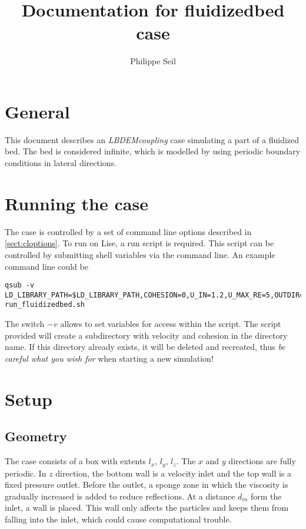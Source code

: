 \documentclass[12pt]{article}
\title{Documentation for fluidizedbed case}
\author{Philippe Seil}
\begin{document}
\maketitle
\tableofcontents

\section{General}

This document describes an \emph{LBDEMcoupling} case simulating a part
of a fluidized bed. The bed is considered infinite, which is modelled
by using periodic boundary conditions in lateral directions. \\

\section{Running the case}

The case is controlled by a set of command line options described in
\cref{sect:cloptions}. To run on Lise, a run script is required. This
script can be controlled by submitting shell variables via the command
line. An example command line could be
\begin{lstlisting}
qsub -v LD_LIBRARY_PATH=$LD_LIBRARY_PATH,COHESION=0,U_IN=1.2,U_MAX_RE=5,OUTDIR=air_test/ run_fluidizedbed.sh
\end{lstlisting}
The switch $-v$ allows to set variables for access within the
script. The script provided will create a subdirectory with velocity
and cohesion in the directory name. If this directory already exists,
it will be deleted and recreated, thus \emph{be careful what you wish
  for} when starting a new simulation! \\

\section{Setup}
\subsection{Geometry}

The case consists of a box with extents $l_x$, $l_y$, $l_z$. The $x$
and $y$ directions are fully periodic. In $z$ direction, the bottom
wall is a velocity inlet and the top wall is a fixed pressure
outlet. Before the outlet, a sponge zone in which the viscosity is
gradually increased is added to reduce reflections. At a distance
$d_{in}$ form the inlet, a wall is placed. This wall only affects the
particles and keeps them from falling into the inlet, which could
cause computational trouble. 
\end{document}
